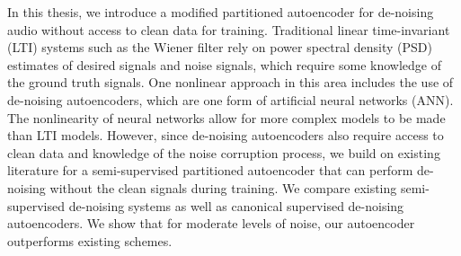 
In this thesis, we introduce a modified partitioned autoencoder for de-noising audio without access to clean data for training. Traditional linear time-invariant (LTI) systems such as the Wiener filter rely on power spectral density (PSD) estimates of desired signals and noise signals, which require some knowledge of the ground truth signals. One nonlinear approach in this area includes the use of de-noising autoencoders, which are one form of artificial neural networks (ANN). The nonlinearity of neural networks allow for more complex models to be made than LTI models. However, since de-noising autoencoders also require access to clean data and knowledge of the noise corruption process, we build on existing literature for a semi-supervised partitioned autoencoder that can perform de-noising without the clean signals during training. We compare existing semi-supervised de-noising systems as well as canonical supervised de-noising autoencoders. We show that for moderate levels of noise, our autoencoder outperforms existing schemes.

